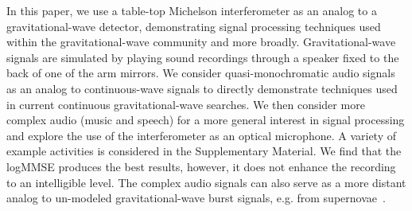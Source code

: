 \documentclass[paper-main.tex]{subfiles}
\begin{document}
In this paper, we use a table-top Michelson interferometer as an analog to a gravitational-wave detector, demonstrating signal processing techniques used within the gravitational-wave community and more broadly. 
Gravitational-wave signals are simulated by playing sound recordings through a speaker fixed to the back of one of the arm mirrors. 
We consider quasi-monochromatic audio signals as an analog to continuous-wave signals to directly demonstrate techniques used in current continuous gravitational-wave searches.
We then consider more complex audio (music and speech) for a more general interest in signal processing and explore the use of the interferometer as an optical microphone. 
A variety of example activities is considered in the Supplementary Material. 
We find that the logMMSE produces the best results, however, it does not enhance the recording to an intelligible level. 
The complex audio signals can also serve as a more distant analog to un-modeled gravitational-wave burst signals, e.g. from supernovae~\cite{MillhouseEtAl:2018,SuvorovaPowellMelatos:2019}. 
\end{document}
